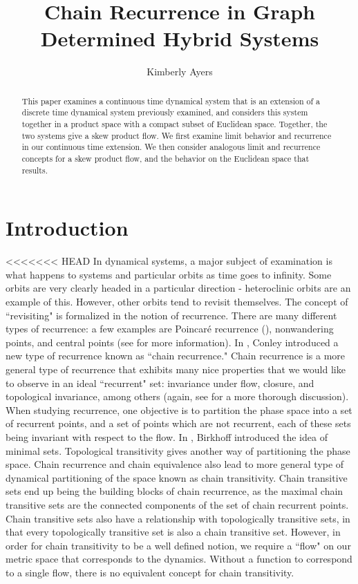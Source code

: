 \documentclass[11pt]{article}
\title{Chain Recurrence in Graph Determined Hybrid Systems}
\author{Kimberly Ayers}
\date{}
\begin{document}
\maketitle

\begin{abstract}
This paper examines a continuous time dynamical system that is an extension of a discrete time dynamical system previously examined, and considers this system together in a product space with a compact subset of Euclidean space. Together, the two systems give a skew product flow.  We first examine limit behavior and recurrence in our continuous time extension.  We then consider analogous limit and recurrence concepts for a skew product flow, and the behavior on the Euclidean space that results. 
\end{abstract}
\section{Introduction}
\vspace{2mm}

<<<<<<< HEAD
\indent In dynamical systems, a major subject of examination is what happens to systems and particular orbits as time goes to infinity.  Some orbits are very clearly headed in a particular direction - heteroclinic orbits are an example of this.  However, other orbits tend to revisit themselves.  The concept of ``revisiting" is formalized in the notion of recurrence.  There are many different types of recurrence: a few examples are Poincar\'e recurrence (\cite{poincare}), nonwandering points, and central points (see \cite{Alongi} for more information).  In \cite{conley}, Conley introduced a new type of recurrence known as ``chain recurrence."  Chain recurrence is a more general type of recurrence that exhibits many nice properties that we would like to observe in an ideal ``recurrent" set: invariance under flow, closure, and topological invariance, among others (again, see \cite{Alongi} for a more thorough discussion).  When studying recurrence, one objective is to partition the phase space into a set of recurrent points, and a set of points which are not recurrent, each of these sets being invariant with respect to the flow.  In \cite{birkhoff1}, Birkhoff introduced the idea of minimal sets.  Topological transitivity gives another way of partitioning the phase space.  Chain recurrence and chain equivalence also lead to more general type of dynamical partitioning of the space known as chain transitivity.    Chain transitive sets end up being the building blocks of chain recurrence, as the maximal chain transitive sets are the connected components of the set of chain recurrent points. Chain transitive sets also have a relationship with topologically transitive sets, in that every topologically transitive set is also a chain transitive set.  However, in order for chain transitivity to be a well defined notion, we require a ``flow" on our metric space that corresponds to the dynamics.  Without a function to correspond to a single flow, there is no equivalent concept for chain transitivity.
\end{document}
